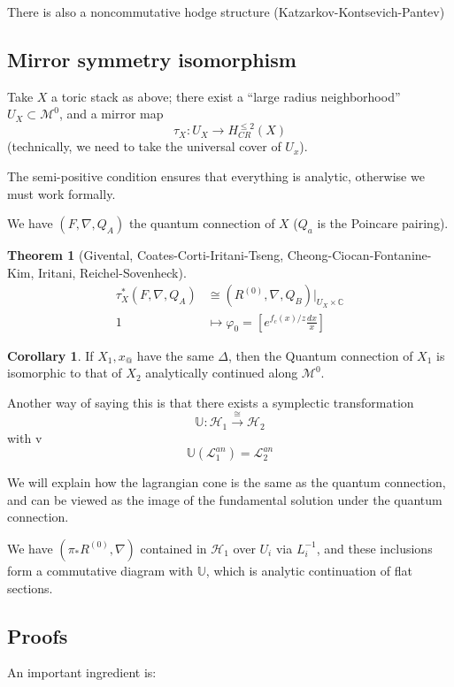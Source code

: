 \documentclass{amsart}
\theoremstyle{definition}
\newtheorem{theorem}[dummy]{Theorem}
\newtheorem{corollary}[dummy]{Corollary}
\newcommand{\M}{\mathcal{M}}
\newcommand{\C}{\mathbb{C}}
\newcommand{\one}{1}
\begin{document}
There is also a noncommutative hodge structure (Katzarkov-Kontsevich-Pantev)

\subsection{Mirror symmetry isomorphism}

Take $X$ a toric stack as above; there exist a ``large radius neighborhood'' $U_X\subset\M^0$, and a mirror map
$$\tau_X:U_X\to H^{\leq2}_{CR}(X)$$
(technically, we need to take the universal cover of $U_x$). 

The semi-positive condition ensures that everything is analytic, otherwise we must work formally.

We have $(F,\nabla, Q_A)$ the quantum connection of $X$ ($Q_a$ is the Poincare pairing).

\begin{theorem}[Givental, Coates-Corti-Iritani-Tseng, Cheong-Ciocan-Fontanine-Kim, Iritani, Reichel-Sovenheck]
\begin{align*}
\tau_X^*(F,\nabla,Q_A)&\cong (R^{(0)},\nabla,Q_B)\big|_{U_X\times\C}\\
\one &\mapsto\varphi_0=\left[e^{f_c(x)/z}\frac{dx}{x}\right]
\end{align*}
\end{theorem}

\begin{corollary}
If $X_1, x_@$ have the same $\Delta$, then the Quantum connection of $X_1$ is isomorphic to that of $X_2$ analytically continued along $\M^0$.

Another way of saying this is that there exists a symplectic transformation 
$$\mathbb{U}:\mathcal{H}_1\stackrel{\cong}\to\mathcal{H}_2$$
with
v$$\mathbb{U}(\mathcal{L}^{an}_1)=\mathcal{L}_2^{an}$$


\end{corollary}

We will explain how the lagrangian cone is the same as the quantum connection, and can be viewed as the image of the fundamental solution under the quantum connection.


We have $(\pi_* R^{(0)}, \nabla)$ contained in $\mathcal{H}_1$ over $U_i$ via $L_i^{-1}$, and these inclusions form a commutative diagram with $\mathbb{U}$, which is analytic continuation of flat sections.

\subsection{Proofs}
An important ingredient is:
\end{document}
